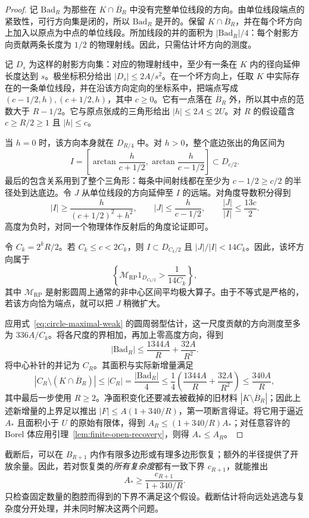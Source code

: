 \begin{proof}
记 $\mathrm{Bad}_R$ 为那些在 $K\cap\overline B_R$ 中没有完整单位线段的方向。由单位线段端点的紧致性，可行方向集是闭的，所以 $\mathrm{Bad}_R$ 是开的。保留 $K\cap\overline B_R$，并在每个坏方向上加入以原点为中点的单位线段。所加线段的并的面积为 $|\mathrm{Bad}_R|/4$：每个射影方向贡献两条长度为 $1/2$ 的物理射线。因此，只需估计坏方向的测度。

记 $D_s$ 为这样的射影方向集：对应的物理射线中，至少有一条在 $K$ 内的径向延伸长度达到 $s$。极坐标积分给出 $|D_s|\le2A/s^2$。在一个坏方向上，任取 $K$ 中实际存在的一条单位线段，并在沿该方向定向的坐标系中，把端点写成 $(c-1/2,h),(c+1/2,h)$，其中 $c\ge0$。它有一点落在 $\overline B_R$ 外，所以其中点的范数大于 $R-1/2$。它与原点张成的三角形给出 $|h|\le2A\le2U$。对 $R$ 的假设蕴含 $c\ge R/2\ge1$ 且 $|h|\le c$。

当 $h=0$ 时，该方向本身就在 $D_{R/4}$ 中。对 $h>0$，整个底边张出的角区间为
\[
 I=\left[\arctan\frac{h}{c+1/2},\arctan\frac{h}{c-1/2}\right]
 \subset D_{c/2}.
\]
最后的包含关系用到了整个三角形：每条中间射线都在至少为 $c-1/2\ge c/2$ 的半径处到达底边。令 $J$ 从单位线段的方向延伸至 $I$ 的远端。对角度导数积分得到
\[
 |I|\ge\frac{h}{(c+1/2)^2+h^2},\qquad
 |J|\le\frac{h}{c-1/2},\qquad
 \frac{|J|}{|I|}\le\frac{13c}{2}.
\]
高度为负时，对同一个物理体作反射后的角度论证即可。

令 $C_k=2^kR/2$。若 $C_k\le c<2C_k$，则 $I\subset D_{C_k/2}$ 且 $|J|/|I|<14C_k$。因此，该坏方向属于
\[
 \left\{\mathcal M_{\mathrm{RP}}1_{D_{C_k/2}}>\frac1{14C_k}\right\},
\]
其中 $\mathcal M_{\mathrm{RP}}$ 是射影圆周上通常的非中心区间平均极大算子。由于不等式是严格的，若该方向恰为端点，就可以把 $J$ 稍微扩大。

应用式~\eqref{eq:circle-maximal-weak} 的圆周弱型估计，这一尺度贡献的方向测度至多为 $336A/C_k$。将各尺度的界相加，再加上零高度方向，得到
\[
 |\mathrm{Bad}_R|\le\frac{1344A}{R}+\frac{32A}{R^2}.
\]
将中心补针的并记为 $C_R$。其面积与实际新增量满足
\[
 |C_R\setminus(K\cap\overline B_R)|\le |C_R|
   =\frac{|\mathrm{Bad}_R|}{4}
   \le\frac14\left(\frac{1344A}{R}+\frac{32A}{R^2}\right)
   \le\frac{340A}{R},
\]
其中最后一步使用 $R\ge2$。净面积变化还要减去被截掉的旧材料 $|K\setminus\overline B_R|$；因此上述新增量的上界足以推出 $|F|\le A(1+340/R)$，第一项断言得证。将它用于逼近 $A_*$ 且面积小于 $U$ 的原始有限体，得到 $A_R\le(1+340/R)A_*$；对任意容许的 Borel 体应用引理~\ref{lem:finite-open-recovery}，则得 $A_*\le A_R$。
\end{proof}

截断后，可以在 $B_{R+1}$ 内作有限多边形或有理多边形恢复；额外的半径提供了开放余量。因此，若对恢复类的\emph{所有复杂度}都有一致下界 $c_{R+1}$，就能推出
\[
 A_*\ge\frac{c_{R+1}}{1+340/R}.
\]
只检查固定数量的胞腔而得到的下界不满足这个假设。截断估计将向远处逃逸与复杂度分开处理，并未同时解决这两个问题。

